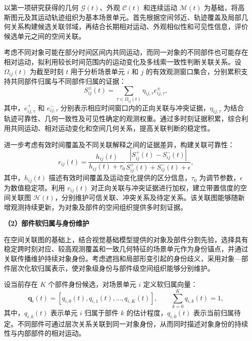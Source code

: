 以第一项研究获得的几何 $\mathcal{G}(t)$、外观 $\mathcal{C}(t)$ 和连续运动 $\mathcal{M}(t)$ 为基础，将高斯图元及其运动轨迹组织为基本场景单元。首先根据空间邻近、轨迹覆盖及局部几何关系构建候选关联邻域，再结合长期相对运动、外观相似性和可见性信息，评价候选单元之间的空间关联。

考虑不同对象可能在部分时间区间内共同运动，而同一对象的不同部件也可能存在相对运动，拟利用较长时间范围内的运动变化及多线索一致性判断关联关系。设 $\Omega_{ij}(t)$ 为截至时刻 $t$ 用于分析场景单元 $i$ 和 $j$ 的有效观测窗口集合，分别累积支持共同部件归属与不同部件归属的证据：
\begin{equation}
  S_{ij}^{\pm}(t)
  =
  \sum_{\tau\in\Omega_{ij}(t)}
  \eta_{ij,\tau}e_{ij,\tau}^{\pm},
  \label{eq:route-object-evidence}
\end{equation}
其中，$e_{ij,\tau}^{+}$ 和 $e_{ij,\tau}^{-}$ 分别表示相应时间窗口内的正向关联与冲突证据，$\eta_{ij,\tau}$ 为结合轨迹可靠性、几何一致性及可见性确定的观测权重。通过多时刻证据积累，综合利用共同运动、相对运动变化和空间几何关系，提高关联判断的稳定性。

进一步考虑有效时间覆盖及不同关联解释之间的证据差异，构建关联可靠性：
\begin{equation}
  r_{ij}(t)
  =
  \frac{h_{ij}(t)}
       {h_{ij}(t)+\tau_0}
  \frac{
    \left|S_{ij}^{+}(t)-S_{ij}^{-}(t)\right|
  }{
    S_{ij}^{+}(t)+S_{ij}^{-}(t)+\epsilon
  },
  \label{eq:route-object-reliability}
\end{equation}
其中，$h_{ij}(t)$ 描述有效时间覆盖及运动变化提供的区分信息，$\tau_0$ 为调节参数，$\epsilon$ 为数值稳定项。利用 $r_{ij}(t)$ 对正向关联与冲突证据进行加权，建立带置信度的空间关联图 $\mathcal{H}(t)$，分别维护可信关联、冲突关系及待定关系。该关联图能够随新增观测持续更新，为对象及部件的空间组织提供多时刻证据。

\noindent\textbf{（2）部件软归属与身份维护}

在空间关联图的基础上，结合视觉基础模型提供的对象及部件分割先验，选择具有稳定跨时刻对应、较高观测覆盖和一致几何特征的场景单元作为身份锚点，并通过关联传播维护持续对象身份。考虑遮挡和局部形变引起的身份歧义，采用对象—部件层次化软归属表示，使对象级身份与部件级空间组织能够分别维护。

设当前存在 $K$ 个部件身份候选，对场景单元 $i$ 定义软归属向量：
\begin{equation}
  \mathbf{q}_i(t)=
  \left[
    q_{i,0}(t),
    q_{i,1}(t),\ldots,q_{i,K}(t)
  \right],
  \qquad
  \sum_{k=0}^{K}q_{i,k}(t)=1,
  \label{eq:route-object-soft-membership}
\end{equation}
其中，$q_{i,k}(t)$ 表示单元 $i$ 归属于部件 $k$ 的估计程度，$q_{i,0}(t)$ 表示当前归属待定。不同部件可通过层次关系关联到同一对象身份，从而同时描述对象身份的持续性与内部部件的相对运动。

